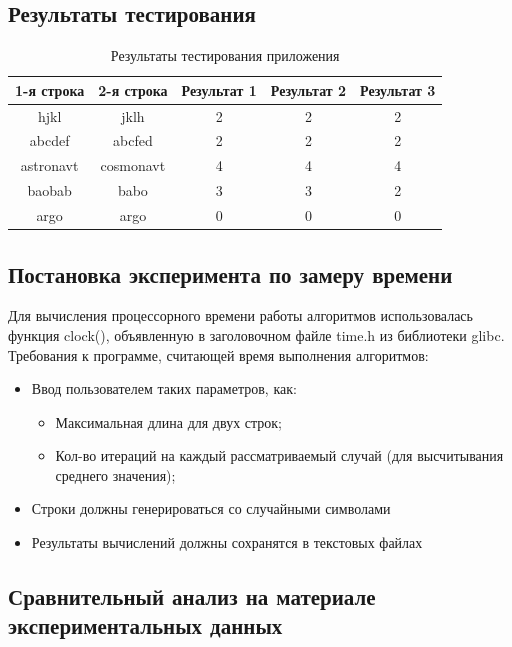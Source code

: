 \documentclass[a4paper,12pt]{article}
\begin{document}
\newpage
\subsection{Результаты тестирования}
\begin{table}[h]
\caption{\label{tablice:tests}Результаты тестирования приложения}
\begin{center}
\begin{tabular}{|c|c|c|c|c|}
\hline 
1-я строка & 2-я строка & Результат 1 & Результат 2 & Результат 3 \\ 
\hline 
hjkl & jklh & 2 & 2 & 2 \\ 
\hline 
abcdef & abcfed & 2 & 2 & 2 \\ 
\hline 
astronavt & cosmonavt & 4 & 4 & 4 \\ 
\hline 
baobab & babo & 3 & 3 & 2 \\ 
\hline 
argo & argo & 0 & 0 & 0 \\ 
\hline 
\end{tabular}
\end{center} 
\end{table}

\newpage
\subsection{Постановка эксперимента по замеру времени}
\begin{flushleft}
Для вычисления процессорного времени работы алгоритмов использовалась функция clock(), объявленную в заголовочном файле time.h из библиотеки glibc. \\
Требования к программе, считающей время выполнения алгоритмов:
\begin{itemize}
\item Ввод пользователем таких параметров, как:
\begin{itemize}
\item Максимальная длина для двух строк;
\item Кол-во итераций на каждый рассматриваемый случай (для высчитывания среднего значения);
\end{itemize}
\item Строки должны генерироваться со случайными символами
\item Результаты вычислений должны сохранятся в текстовых файлах
\end{itemize}
\end{flushleft}

\newpage
\subsection{Сравнительный анализ на материале экспериментальных данных}
\end{document}

